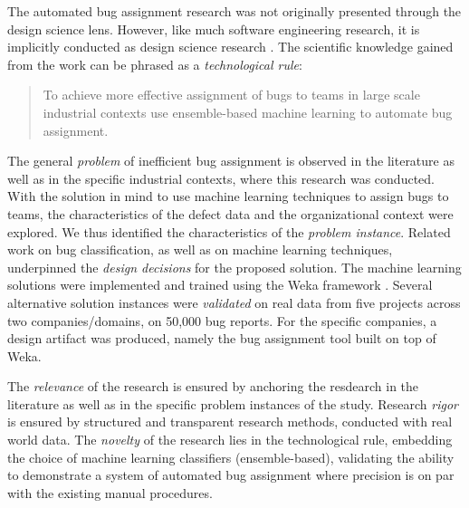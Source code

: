 \documentclass[graybox]{svmult}
\begin{document}
The automated bug assignment research was not originally presented through the design science lens. However, like much software engineering research, it is implicitly conducted as design science research \cite{Engstrom19arxiv}. 
The scientific knowledge gained from the work can be phrased as a \emph{technological rule}:
\begin{quote}{To achieve more effective assignment of bugs to teams in large scale industrial contexts use ensemble-based machine learning to automate bug assignment. \cite{StoreyESEM17}}\end{quote}

The general \emph{problem} of inefficient bug assignment is observed in the literature as well as in the specific industrial contexts, where this research was conducted. With the solution in mind to use machine learning techniques to assign bugs to teams, the characteristics of the defect data and the organizational context were explored. We thus identified the characteristics of the \emph{problem instance}. Related work on bug classification, as well as on machine learning techniques, underpinned the \emph{design decisions} for the proposed solution. The machine learning solutions were implemented  and trained using the Weka framework \cite{hall_weka_2009}. Several alternative solution instances were \emph{validated} on real data from five projects across two companies/domains, on 50,000 bug reports. For the specific companies, a design artifact was produced, namely the bug assignment tool built on top of Weka.

The \emph{relevance} of the research is ensured by anchoring the resdearch in the literature as well as in the specific problem instances of the study. Research \emph{rigor} is ensured by structured and transparent research methods, conducted with real world data. The \emph{novelty} of the research lies in the technological rule, embedding the choice of machine learning classifiers (ensemble-based), validating the ability to demonstrate a system of automated bug assignment where precision is on par with the existing manual procedures.
\end{document}
